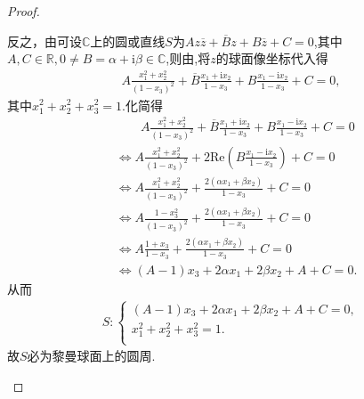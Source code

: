 \documentclass[../../main.tex]{subfiles}%
\begin{document}
\begin{proof}
\begin{enumerate}[(1)]
反之，由可设$\mathbb{C}$上的圆或直线$S$为$A z\overline{z} + \overline{B}z + B\overline{z} + C = 0$,其中$A,C\in \mathbb{R},0\neq B=\alpha+\text{i}\beta \in \mathbb{C}$,则由,将$z$的球面像坐标代入得
\begin{align*}
A\frac{x_1^2 + x_2^2}{(1 - x_3)^2} + \overline{B}\frac{x_1 + \text{i}x_2}{1 - x_3} + B\frac{x_1 - \text{i}x_2}{1 - x_3} + C = 0,
\end{align*}
其中$x_1^2+x_2^2+x_3^2=1$.化简得
\begin{align*}
&\quad \quad A\frac{x_{1}^{2}+x_{2}^{2}}{(1-x_3)^2}+\overline{B}\frac{x_1+\mathrm{i}x_2}{1-x_3}+B\frac{x_1-\mathrm{i}x_2}{1-x_3}+C=0
\\
&\Longleftrightarrow A\frac{x_{1}^{2}+x_{2}^{2}}{(1-x_3)^2}+2\mathrm{Re}\left( B\frac{x_1-\mathrm{i}x_2}{1-x_3} \right) +C=0
\\
&\Longleftrightarrow A\frac{x_{1}^{2}+x_{2}^{2}}{(1-x_3)^2}+\frac{2\left( \alpha x_1+\beta x_2 \right)}{1-x_3}+C=0
\\
&\Longleftrightarrow A\frac{1-x_{3}^{2}}{(1-x_3)^2}+\frac{2\left( \alpha x_1+\beta x_2 \right)}{1-x_3}+C=0
\\
&\Longleftrightarrow A\frac{1+x_3}{1-x_3}+\frac{2\left( \alpha x_1+\beta x_2 \right)}{1-x_3}+C=0
\\
&\Longleftrightarrow \left( A-1 \right) x_3+2\alpha x_1+2\beta x_2+A+C=0.
\end{align*}
从而
\begin{align*}
S:\begin{cases}
\left( A-1 \right) x_3+2\alpha x_1+2\beta x_2+A+C=0,\\
x_{1}^{2}+x_{2}^{2}+x_{3}^{2}=1.\\
\end{cases}
\end{align*}
故$S$必为黎曼球面上的圆周.


\end{enumerate}
\end{proof}
\end{document}
